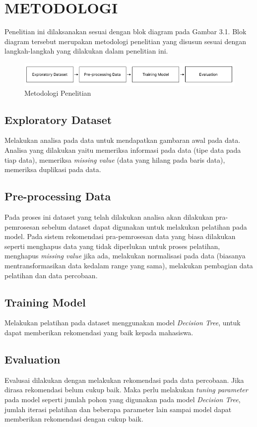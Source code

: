 \section{METODOLOGI}

Penelitian ini dilaksanakan sesuai dengan blok diagram pada Gambar 3.1. Blok diagram tersebut
merupakan metodologi penelitian yang disusun sesuai dengan langkah-langkah yang dilakukan dalam penelitian ini.

\begin{figure} [ht] \centering
  \includegraphics[width=160mm]{gambar/metodologi.png}
  \caption{Metodologi Penelitian}
\end{figure}


\subsection{Exploratory Dataset}
Melakukan analisa pada data untuk mendapatkan gambaran awal pada data. Analisa yang dilakukan yaitu
memeriksa informasi pada data (tipe data pada tiap data), memeriksa \emph{missing value} {(data yang hilang pada baris data)},
memeriksa duplikasi pada data.


\subsection{Pre-processing Data}
Pada proses ini dataset yang telah dilakukan analisa akan dilakukan pra-pemrosesan sebelum dataset dapat digunakan
untuk melakukan pelatihan pada model. Pada sistem rekomendasi pra-pemrosesan data yang biasa dilakukan seperti menghapus data
yang tidak diperlukan untuk proses pelatihan, menghapus \emph{missing value} jika ada, melakukan normalisasi pada data (biasanya mentransformasikan data kedalam range yang sama),
melakukan pembagian data pelatihan dan data percobaan.

\subsection{Training Model}
Melakukan pelatihan pada dataset menggunakan model \emph{Decision Tree}, untuk dapat memberikan rekomendasi yang baik kepada mahasiswa.

\subsection{Evaluation}
Evalusai dilakukan dengan melakukan rekomendasi pada data percobaan. Jika dirasa rekomendasi belum cukup baik. Maka perlu melakukan
\emph{tuning parameter} pada model seperti jumlah pohon yang digunakan pada model \emph{Decision Tree}, jumlah iterasi pelatihan dan
beberapa parameter lain sampai model dapat memberikan rekomendasi dengan cukup baik.

